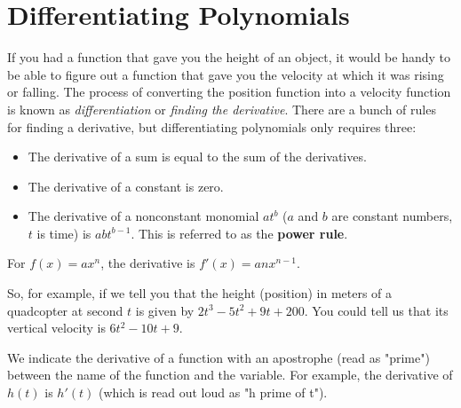 \chapter{Differentiating Polynomials}

If you had a function that gave you the height of an object, it would
be handy to be able to figure out a function that gave you the
velocity at which it was rising or falling. The process of converting
the position function into a velocity function is known as
\emph{differentiation} or \emph{finding the derivative}.
There are a bunch of rules for finding a derivative, but
differentiating polynomials only requires three:
\begin{itemize}
\item The derivative of a sum is equal to the sum of the derivatives.
\item The derivative of a constant is zero.
\item The derivative of a nonconstant monomial $at^b$ ($a$ and $b$ are constant numbers, $t$ is time) is $abt^{b-1}$. This is referred to as the \textbf{power rule}. 
\end{itemize}

\begin{mdframed}[frametitle = {Power Rule}, style = important]
For \( f(x) = ax^n \), the derivative is \( f'(x) = anx^{n-1} \).
\end{mdframed}

So, for example, if we tell you that the height (position) in meters of a quadcopter
at second $t$ is given by $2t^3 - 5t^2 + 9t + 200$. You could tell us
that its vertical velocity is $6t^{2} - 10t + 9$.

We indicate the derivative of a function with an apostrophe (read as "prime") between the name of the function and the variable. For example, the derivative of $h(t)$ is $h'(t)$ (which is read out loud as "h prime of t"). 

